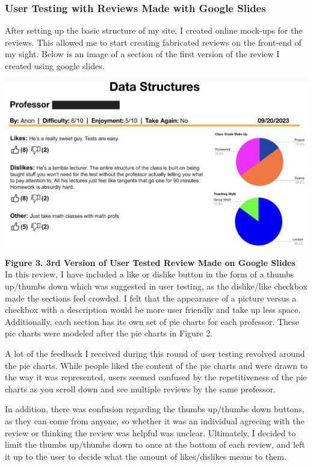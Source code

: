 \documentclass[10pt,twocolumn]{article}
\begin{document}
\subsubsection{User Testing with Reviews Made with Google Slides}
After setting up the basic structure of my site, I created online mock-ups for the reviews. This allowed me to start creating fabricated reviews on the front-end of my sight. Below is an image of a section of the first version of the review I created using google slides. 

\includegraphics[scale=.25]{UT3}\\ \textbf{\footnotesize{Figure 3. 3rd Version of User Tested Review Made on Google Slides}}\\

In this review, I have included a like or dislike button in the form of a thumbs up/thumbs down which was suggested in user testing, as the dislike/like checkbox made the sections feel crowded. I felt that the appearance of a picture versus a checkbox with a description would be more user friendly and take up less space. Additionally, each section has its own set of pie charts for each professor. These pie charts were modeled after the pie charts in Figure 2.

A lot of the feedback I received during this round of user testing revolved around the pie charts. While people liked the content of the pie charts and were drawn to the way it was represented, users seemed confused by the repetitiveness of the pie charts as you scroll down and see multiple reviews by the same professor. 

In addition, there was confusion regarding the thumbs up/thumbs down buttons, as they can come from anyone, so whether it was an individual agreeing with the review or thinking the review was helpful was unclear. Ultimately, I decided to limit the thumbs up/thumbs down to once at the bottom of each review, and left it up to the user to decide what the amount of likes/dislikes means to them.
\end{document}
